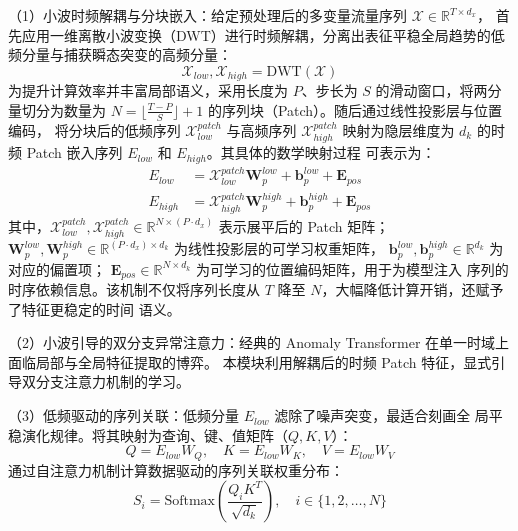 （1）小波时频解耦与分块嵌入：给定预处理后的多变量流量序列 $\mathcal{X} \in \mathbb{R}^{T \times d_x}$，
首先应用一维离散小波变换（DWT）进行时频解耦，分离出表征平稳全局趋势的低频分量与捕获瞬态突变的高频分量：
\begin{equation}
    \mathcal{X}_{low}, \mathcal{X}_{high} = \text{DWT}(\mathcal{X})
\end{equation}
为提升计算效率并丰富局部语义，采用长度为 $P$、步长为 $S$ 的滑动窗口，将两分量切分为数量为 
$N = \lfloor \frac{T-P}{S} \rfloor + 1$ 的序列块（Patch）。随后通过线性投影层与位置编码，
将分块后的低频序列 $\mathcal{X}_{low}^{patch}$ 与高频序列 $\mathcal{X}_{high}^{patch}$ 
映射为隐层维度为 $d_k$ 的时频 Patch 嵌入序列 $E_{low}$ 和 $E_{high}$。其具体的数学映射过程
可表示为：
\begin{equation}
\begin{aligned}
E_{low} &= \mathcal{X}_{low}^{patch} \mathbf{W}_{p}^{low} + \mathbf{b}_{p}^{low} + \mathbf{E}_{pos} \\
E_{high} &= \mathcal{X}_{high}^{patch} \mathbf{W}_{p}^{high} + \mathbf{b}_{p}^{high} + \mathbf{E}_{pos}
\end{aligned}
\end{equation}
其中，$\mathcal{X}_{low}^{patch}, \mathcal{X}_{high}^{patch} \in \mathbb{R}^{N \times (P \cdot d_x)}$ 表示展平后的 Patch 矩阵；
$\mathbf{W}_{p}^{low}, \mathbf{W}_{p}^{high} \in \mathbb{R}^{(P \cdot d_x) \times d_k}$ 为线性投影层的可学习权重矩阵，
$\mathbf{b}_{p}^{low}, \mathbf{b}_{p}^{high} \in \mathbb{R}^{d_k}$ 为对应的偏置项；
$\mathbf{E}_{pos} \in \mathbb{R}^{N \times d_k}$ 为可学习的位置编码矩阵，用于为模型注入
序列的时序依赖信息。该机制不仅将序列长度从 $T$ 降至 $N$，大幅降低计算开销，还赋予了特征更稳定的时间
语义。

（2）小波引导的双分支异常注意力：经典的 Anomaly Transformer 在单一时域上面临局部与全局特征提取的博弈。
本模块利用解耦后的时频 Patch 特征，显式引导双分支注意力机制的学习。

（3）低频驱动的序列关联：低频分量 $E_{low}$ 滤除了噪声突变，最适合刻画全
局平稳演化规律。将其映射为查询、键、值矩阵（$Q, K, V$）：
\begin{equation}
    Q = E_{low} W_Q, \quad K = E_{low} W_K, \quad V = E_{low} W_V
\end{equation}
通过自注意力机制计算数据驱动的序列关联权重分布：
\begin{equation}
    S_i = \text{Softmax}\left(\frac{Q_i K^T}{\sqrt{d_k}}\right), \quad i \in \{1, 2, \ldots, N\}
\end{equation}


